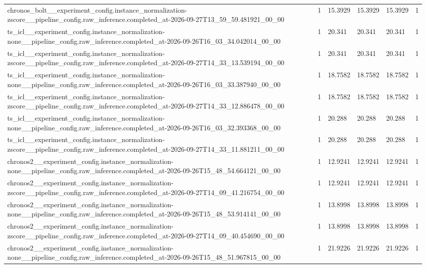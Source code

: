 \begin{tabular}{llllll}
chronos\_bolt\_\_experiment\_config.instance\_normalization-zscore\_\_pipeline\_config.raw\_inference.completed\_at-2026-09-27T13\_59\_59.481921\_00\_00 & 1 & 15.3929 & 15.3929 & 15.3929 & 1 \\
ts\_icl\_\_experiment\_config.instance\_normalization-none\_\_pipeline\_config.raw\_inference.completed\_at-2026-09-26T16\_03\_34.042014\_00\_00 & 1 & 20.341 & 20.341 & 20.341 & 1 \\
ts\_icl\_\_experiment\_config.instance\_normalization-zscore\_\_pipeline\_config.raw\_inference.completed\_at-2026-09-27T14\_33\_13.539194\_00\_00 & 1 & 20.341 & 20.341 & 20.341 & 1 \\
ts\_icl\_\_experiment\_config.instance\_normalization-none\_\_pipeline\_config.raw\_inference.completed\_at-2026-09-26T16\_03\_33.387940\_00\_00 & 1 & 18.7582 & 18.7582 & 18.7582 & 1 \\
ts\_icl\_\_experiment\_config.instance\_normalization-zscore\_\_pipeline\_config.raw\_inference.completed\_at-2026-09-27T14\_33\_12.886478\_00\_00 & 1 & 18.7582 & 18.7582 & 18.7582 & 1 \\
ts\_icl\_\_experiment\_config.instance\_normalization-none\_\_pipeline\_config.raw\_inference.completed\_at-2026-09-26T16\_03\_32.393368\_00\_00 & 1 & 20.288 & 20.288 & 20.288 & 1 \\
ts\_icl\_\_experiment\_config.instance\_normalization-zscore\_\_pipeline\_config.raw\_inference.completed\_at-2026-09-27T14\_33\_11.881211\_00\_00 & 1 & 20.288 & 20.288 & 20.288 & 1 \\
chronos2\_\_experiment\_config.instance\_normalization-none\_\_pipeline\_config.raw\_inference.completed\_at-2026-09-26T15\_48\_54.664121\_00\_00 & 1 & 12.9241 & 12.9241 & 12.9241 & 1 \\
chronos2\_\_experiment\_config.instance\_normalization-zscore\_\_pipeline\_config.raw\_inference.completed\_at-2026-09-27T14\_09\_41.216754\_00\_00 & 1 & 12.9241 & 12.9241 & 12.9241 & 1 \\
chronos2\_\_experiment\_config.instance\_normalization-none\_\_pipeline\_config.raw\_inference.completed\_at-2026-09-26T15\_48\_53.914141\_00\_00 & 1 & 13.8998 & 13.8998 & 13.8998 & 1 \\
chronos2\_\_experiment\_config.instance\_normalization-zscore\_\_pipeline\_config.raw\_inference.completed\_at-2026-09-27T14\_09\_40.454690\_00\_00 & 1 & 13.8998 & 13.8998 & 13.8998 & 1 \\
chronos2\_\_experiment\_config.instance\_normalization-none\_\_pipeline\_config.raw\_inference.completed\_at-2026-09-26T15\_48\_51.967815\_00\_00 & 1 & 21.9226 & 21.9226 & 21.9226 & 1 \\

\end{tabular}
